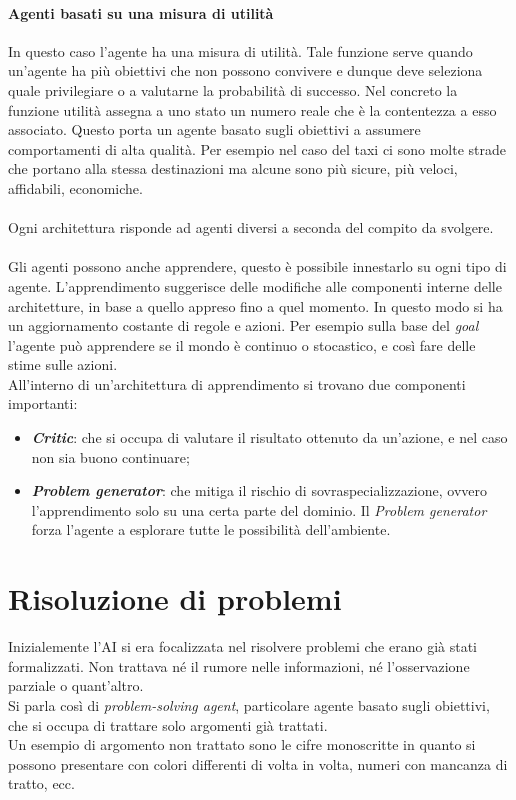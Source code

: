 \documentclass[10pt,a4paper]{book}
\begin{document}
\subsubsection{Agenti basati su una misura di utilit\`a}
In questo caso l'agente ha una misura di utilit\`a. Tale funzione serve quando un'agente ha pi\`u obiettivi che non possono convivere e dunque deve seleziona quale privilegiare o a valutarne la probabilit\`a di successo. Nel concreto la funzione utilit\`a  assegna a uno stato un numero reale che \`e la contentezza a esso associato.
Questo porta un agente basato sugli obiettivi a assumere comportamenti di alta qualit\`a. Per esempio nel caso del taxi ci sono molte strade che portano alla stessa destinazioni ma alcune sono pi\`u sicure, pi\`u veloci, affidabili, economiche.
\\\\
\noindent
Ogni architettura risponde ad agenti diversi a seconda del compito da svolgere.
\\\\
Gli agenti possono anche apprendere, questo \`e possibile innestarlo su ogni tipo di agente. L'apprendimento suggerisce delle modifiche alle componenti interne delle architetture, in base a quello appreso fino a quel momento. In questo modo si ha un aggiornamento costante di regole e azioni. Per esempio sulla base del \textit{goal} l'agente pu\`o apprendere se il mondo \`e continuo o stocastico, e cos\`i fare delle stime sulle azioni.\\
All'interno di un'architettura di apprendimento si trovano due componenti importanti:
\begin{itemize}
\item \textbf{\textit{Critic}}: che si occupa di valutare il risultato ottenuto da un'azione, e nel caso non sia buono continuare;
\item \textbf{\textit{Problem generator}}: che mitiga il rischio di sovraspecializzazione, ovvero l'apprendimento solo su una certa parte del dominio. Il \textit{Problem generator} forza l'agente a esplorare tutte le possibilit\`a dell'ambiente.
\end{itemize}
\newpage
\chapter{Risoluzione di problemi}
Inizialemente l'AI si era focalizzata nel risolvere problemi che erano gi\`a stati formalizzati. Non trattava n\'e il rumore nelle informazioni, n\'e l'osservazione parziale o quant'altro.\\
Si parla cos\`i di \textit{problem-solving agent}, particolare agente basato sugli obiettivi, che si occupa di trattare solo argomenti gi\`a trattati.\\
Un esempio di argomento non trattato sono le cifre monoscritte in quanto si possono presentare con colori differenti di volta in volta, numeri con mancanza di tratto, ecc.\\
\end{document}
